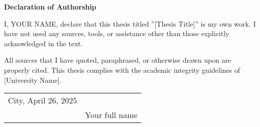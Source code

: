 \begin{center}
    \noindent \large\textbf{Declaration of Authorship}
\end{center}

\vspace{1cm}
\noindent I, YOUR NAME, declare that this thesis titled ”[Thesis Title]” is my own work. I have not used any sources, tools, or assistance other than those explicitly acknowledged in the text.\vspace{.3cm}

\noindent All sources that I have quoted, paraphrased, or otherwise drawn upon are properly cited. This thesis complies with the academic integrity guidelines of [University Name].

\vspace{35mm}
\begin{tabular}{@{}p{2in}p{3.5in}@{}}
City, April 26, 2025 & \hrulefill\\
& \centering Your full name \\
\end{tabular} 

